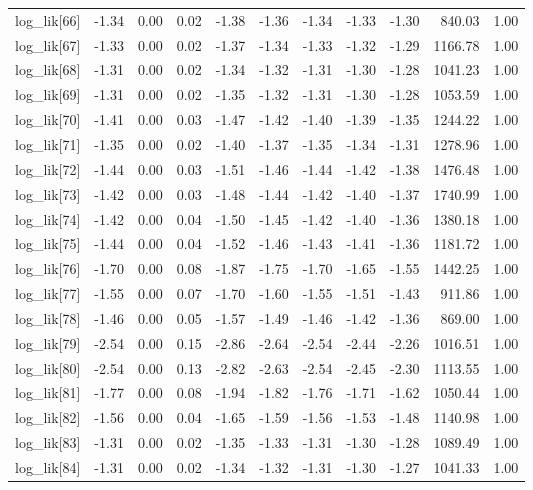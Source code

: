 \begin{table}[ht]
\begin{tabular}{rrrrrrrrrrr}
  log\_lik[66] & -1.34 & 0.00 & 0.02 & -1.38 & -1.36 & -1.34 & -1.33 & -1.30 & 840.03 & 1.00 \\ 
  log\_lik[67] & -1.33 & 0.00 & 0.02 & -1.37 & -1.34 & -1.33 & -1.32 & -1.29 & 1166.78 & 1.00 \\ 
  log\_lik[68] & -1.31 & 0.00 & 0.02 & -1.34 & -1.32 & -1.31 & -1.30 & -1.28 & 1041.23 & 1.00 \\ 
  log\_lik[69] & -1.31 & 0.00 & 0.02 & -1.35 & -1.32 & -1.31 & -1.30 & -1.28 & 1053.59 & 1.00 \\ 
  log\_lik[70] & -1.41 & 0.00 & 0.03 & -1.47 & -1.42 & -1.40 & -1.39 & -1.35 & 1244.22 & 1.00 \\ 
  log\_lik[71] & -1.35 & 0.00 & 0.02 & -1.40 & -1.37 & -1.35 & -1.34 & -1.31 & 1278.96 & 1.00 \\ 
  log\_lik[72] & -1.44 & 0.00 & 0.03 & -1.51 & -1.46 & -1.44 & -1.42 & -1.38 & 1476.48 & 1.00 \\ 
  log\_lik[73] & -1.42 & 0.00 & 0.03 & -1.48 & -1.44 & -1.42 & -1.40 & -1.37 & 1740.99 & 1.00 \\ 
  log\_lik[74] & -1.42 & 0.00 & 0.04 & -1.50 & -1.45 & -1.42 & -1.40 & -1.36 & 1380.18 & 1.00 \\ 
  log\_lik[75] & -1.44 & 0.00 & 0.04 & -1.52 & -1.46 & -1.43 & -1.41 & -1.36 & 1181.72 & 1.00 \\ 
  log\_lik[76] & -1.70 & 0.00 & 0.08 & -1.87 & -1.75 & -1.70 & -1.65 & -1.55 & 1442.25 & 1.00 \\ 
  log\_lik[77] & -1.55 & 0.00 & 0.07 & -1.70 & -1.60 & -1.55 & -1.51 & -1.43 & 911.86 & 1.00 \\ 
  log\_lik[78] & -1.46 & 0.00 & 0.05 & -1.57 & -1.49 & -1.46 & -1.42 & -1.36 & 869.00 & 1.00 \\ 
  log\_lik[79] & -2.54 & 0.00 & 0.15 & -2.86 & -2.64 & -2.54 & -2.44 & -2.26 & 1016.51 & 1.00 \\ 
  log\_lik[80] & -2.54 & 0.00 & 0.13 & -2.82 & -2.63 & -2.54 & -2.45 & -2.30 & 1113.55 & 1.00 \\ 
  log\_lik[81] & -1.77 & 0.00 & 0.08 & -1.94 & -1.82 & -1.76 & -1.71 & -1.62 & 1050.44 & 1.00 \\ 
  log\_lik[82] & -1.56 & 0.00 & 0.04 & -1.65 & -1.59 & -1.56 & -1.53 & -1.48 & 1140.98 & 1.00 \\ 
  log\_lik[83] & -1.31 & 0.00 & 0.02 & -1.35 & -1.33 & -1.31 & -1.30 & -1.28 & 1089.49 & 1.00 \\ 
  log\_lik[84] & -1.31 & 0.00 & 0.02 & -1.34 & -1.32 & -1.31 & -1.30 & -1.27 & 1041.33 & 1.00 \\ 

\end{tabular}
\end{table}
